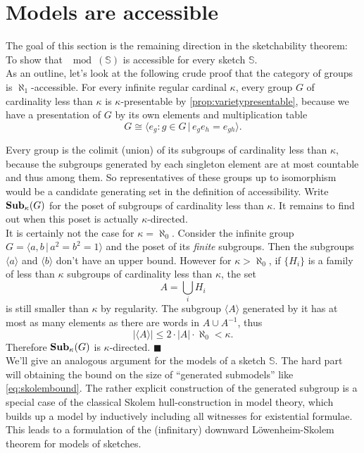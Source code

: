 \section{Models are accessible}
\label{sec:sketchesaccessible}

The goal of this section is the remaining direction in the sketchability theorem: To show that $\mod(\mathbb S)$ is accessible for every sketch $\mathbb S$. \\

As an outline, let's look at the following crude proof that the category of groups is $\aleph_1$-accessible. For every infinite regular cardinal $\kappa$, every group $G$ of cardinality less than $\kappa$ is $\kappa$-presentable by \ref{prop:varietypresentable}, because we have a presentation of $G$ by its own elements and multiplication table
\[ G \cong \langle e_g : g \in G \,|\, e_g e_h = e_{gh} \rangle. \]

Every group is the colimit (union) of its subgroups of cardinality less than $\kappa$, because the subgroups generated by each singleton element are at most countable and thus among them. So representatives of these groups up to isomorphism would be a candidate generating set in the definition of accessibility. Write $\mathbf{Sub}_\kappa(G)$ for the poset of subgroups of cardinality less than $\kappa$. It remains to find out when this poset is actually $\kappa$-directed. \\

It is certainly not the case for $\kappa=\aleph_0$. Consider the infinite group $G=\langle a, b \,|\, a^2 = b^2 = 1 \rangle$ and the poset of its \emph{finite} subgroups. Then the subgroups $\langle a \rangle$ and $\langle b \rangle$ don't have an upper bound. 
However for $\kappa > \aleph_0$, if $\{H_i\}$ is a family of less than $\kappa$ subgroups of cardinality less than $\kappa$, the set \[ A = \bigcup_i H_i \]
is still smaller than $\kappa$ by regularity. The subgroup $\langle A \rangle$ generated by it has at most as many elements as there are words in $A \cup A^{-1}$, thus
\begin{equation} |\langle A \rangle| \leq 2 \cdot |A|\cdot \aleph_0 < \kappa. \label{eq:skolembound} \end{equation}
Therefore $\mathbf{Sub}_\kappa(G)$ is $\kappa$-directed. $\blacksquare$ \\

We'll give an analogous argument for the models of a sketch $\mathbb S$. The hard part will obtaining the bound on the size of ``generated submodels'' like \eqref{eq:skolembound}. The rather explicit construction of the generated subgroup is a special case of the classical Skolem hull-construction in model theory, which builds up a model by inductively including all witnesses for existential formulae. This leads to a formulation of the (infinitary) downward Löwenheim-Skolem theorem for models of sketches. \\

